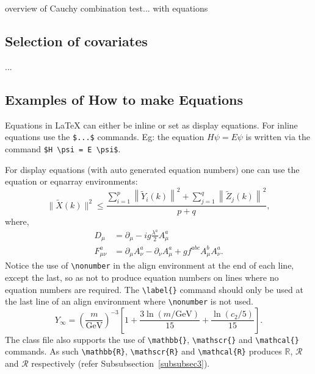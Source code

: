 \documentclass[unnumsec,webpdf,contemporary,large]{oup-authoring-template}%
\theoremstyle{thmstyleone}%
\theoremstyle{thmstyletwo}%
\theoremstyle{thmstylethree}%
\begin{document}
overview of Cauchy combination test... with equations

\subsection{Selection of covariates}

...

\subsection{Examples of How to make Equations}\label{subsec3}


Equations in \LaTeX{} can either be inline or set as display equations. For
inline equations use the \verb+$...$+ commands. Eg: the equation
$H\psi = E \psi$ is written via the command \verb+$H \psi = E \psi$+.

For display equations (with auto generated equation numbers)
one can use the equation or eqnarray environments:
\begin{equation}
\|\tilde{X}(k)\|^2 \leq\frac{\sum\limits_{i=1}^{p}\left\|\tilde{Y}_i(k)\right\|^2+\sum\limits_{j=1}^{q}\left\|\tilde{Z}_j(k)\right\|^2 }{p+q},\label{eq1}
\end{equation}
where,
\begin{align}
D_\mu &=  \partial_\mu - ig \frac{\lambda^a}{2} A^a_\mu \nonumber \\
F^a_{\mu\nu} &= \partial_\mu A^a_\nu - \partial_\nu A^a_\mu + g f^{abc} A^b_\mu A^a_\nu.\label{eq2}
\end{align}
Notice the use of \verb+\nonumber+ in the align environment at the end
of each line, except the last, so as not to produce equation numbers on
lines where no equation numbers are required. The \verb+\label{}+ command
should only be used at the last line of an align environment where
\verb+\nonumber+ is not used.
\begin{equation}
Y_\infty = \left( \frac{m}{\textrm{GeV}} \right)^{-3}
    \left[ 1 + \frac{3 \ln(m/\textrm{GeV})}{15}
    + \frac{\ln(c_2/5)}{15} \right].
\end{equation}
The class file also supports the use of \verb+\mathbb{}+, \verb+\mathscr{}+ and
\verb+\mathcal{}+ commands. As such \verb+\mathbb{R}+, \verb+\mathscr{R}+
and \verb+\mathcal{R}+ produces $\mathbb{R}$, $\mathscr{R}$ and $\mathcal{R}$
respectively (refer Subsubsection~\ref{subsubsec3}).
\end{document}
